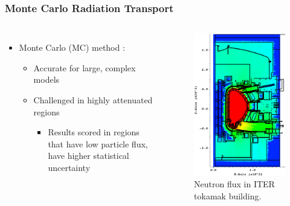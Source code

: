 \documentclass{beamer}
\begin{document}
\begin{frame}
\frametitle{Monte Carlo Radiation Transport}
\begin{columns}
\begin{itemize}
	\item{Monte Carlo (MC) method \cite{mcnp_manual}:}%
	\begin{itemize}
		\item{Accurate for large, complex models}
		\item{Challenged in highly attenuated regions}
                  \begin{itemize}
                  \item{Results scored in regions that have low particle flux, have higher statistical uncertainty}
                  \end{itemize}
	\end{itemize}
\end{itemize}

\begin{figure}
	\centering
	\includegraphics[scale=0.4]{iter_nflux_2.png}
	\caption{Neutron flux in ITER tokamak building.}
\end{figure}


\end{columns}
\end{frame}
\end{document}
